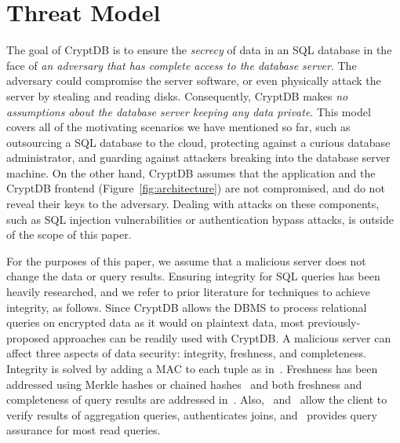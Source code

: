 \section{Threat Model}
\label{s:model}

The goal of CryptDB is to ensure
the \textit{secrecy} of data in an SQL database in the face of \textit{an
adversary that has complete access to the database server}. The adversary could
compromise the server software, or even physically attack the server by stealing
and reading disks. Consequently, CryptDB makes \textit{no assumptions about the
database server keeping any data private}. This model covers all of the
motivating scenarios we have mentioned so far, such as outsourcing a SQL
database to the cloud, protecting against a curious database administrator,
and guarding against attackers breaking into the database server machine.
On the other hand, CryptDB assumes that the application and the CryptDB
frontend (Figure~\ref{fig:architecture}) are not compromised, and do not
reveal their keys to the adversary.  Dealing with attacks on these components,
such as SQL injection vulnerabilities or authentication bypass attacks, is
outside of the scope of this paper.

For the purposes of this paper, we assume that a malicious server does not
change the data or query results.  Ensuring integrity for SQL queries has
been heavily researched, and we refer to prior literature for techniques
to achieve integrity, as follows.  Since CryptDB allows the DBMS to process
relational queries on encrypted data as it would on plaintext data, most
previously-proposed approaches can be readily used with CryptDB\@.
A malicious server can affect three aspects of data security:
integrity, freshness, and completeness. Integrity is solved by adding
a MAC to each tuple as in~\cite{li:sundr,plutus,sirius}. Freshness
has been addressed using Merkle hashes or chained
hashes~\cite{plutus,cloudproof,sirius} and both freshness and
completeness of query results are addressed in~\cite{queryassurance}.
Also,~\cite{Li-Reyzin-06authenticatedindex}
and~\cite{Thompson_privacy-preservingcomputation} allow the client to verify
results of aggregation queries, \cite{authenticate-join} authenticates joins,
and~\cite{sion-assurance} provides query assurance for most read queries.


